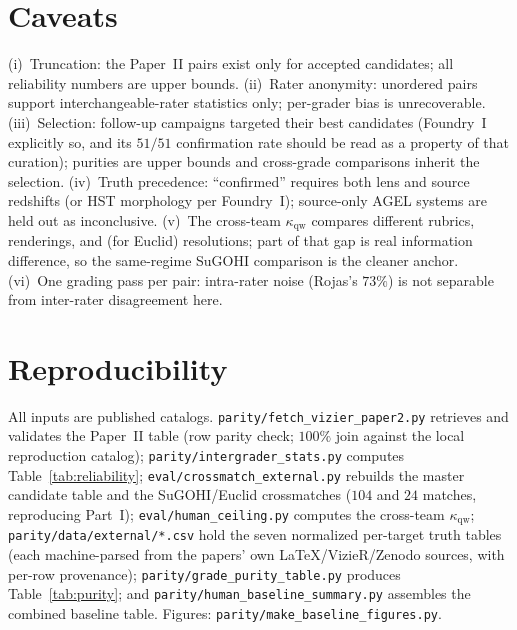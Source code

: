 \documentclass[11pt,letterpaper]{article}
\newcommand{\qwk}{\ensuremath{\kappa_{\mathrm{qw}}}}
\begin{document}
\section{Caveats}\label{sec:caveats}
(i)~Truncation: the Paper~II pairs exist only for accepted candidates; all reliability numbers
are upper bounds. (ii)~Rater anonymity: unordered pairs support interchangeable-rater statistics
only; per-grader bias is unrecoverable. (iii)~Selection: follow-up campaigns targeted their best
candidates (Foundry~I explicitly so, and its $51/51$ confirmation rate should be read as a
property of that curation); purities are upper bounds and cross-grade comparisons inherit the
selection. (iv)~Truth precedence: ``confirmed'' requires both lens and source redshifts (or HST
morphology per Foundry~I); source-only AGEL systems are held out as inconclusive. (v)~The
cross-team \qwk{} compares different rubrics, renderings, and (for Euclid) resolutions; part of
that gap is real information difference, so the same-regime SuGOHI comparison is the cleaner
anchor. (vi)~One grading pass per pair: intra-rater noise (Rojas's $73\%$) is not separable from
inter-rater disagreement here.

\section{Reproducibility}\label{sec:repro}
All inputs are published catalogs. \texttt{parity/fetch\_vizier\_paper2.py} retrieves and
validates the Paper~II table (row parity check; $100\%$ join against the local reproduction
catalog); \texttt{parity/intergrader\_stats.py} computes Table~\ref{tab:reliability};
\texttt{eval/crossmatch\_external.py} rebuilds the master candidate table and the
SuGOHI/Euclid crossmatches ($104$ and $24$ matches, reproducing Part~I);
\texttt{eval/human\_ceiling.py} computes the cross-team \qwk{};
\texttt{parity/data/external/*.csv} hold the seven normalized per-target truth tables (each
machine-parsed from the papers' own LaTeX/VizieR/Zenodo sources, with per-row provenance);
\texttt{parity/grade\_purity\_table.py} produces Table~\ref{tab:purity}; and
\texttt{parity/human\_baseline\_summary.py} assembles the combined baseline table. Figures:
\texttt{parity/make\_baseline\_figures.py}.



\end{document}
